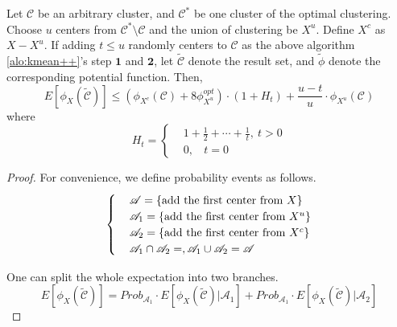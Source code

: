          \begin{lemma}
         \label{corele}
         Let $\mathcal{C}$ be an arbitrary cluster, and $\mathcal{C}^{*}$ be one cluster of the optimal clustering. Choose $u$ centers from $\mathcal{C}^{*} \setminus \mathcal{C}$ and the union of clustering be $X^{u}$. Define $X^{c}$ as $X - X^{u}$. If adding $t \leq u$ randomly centers to $\mathcal{C}$ as the above algorithm \ref{alo:kmean++}'s step $\textbf{1}$ and $\textbf{2}$, let $\tilde{\mathcal{C}}$ denote the result set, and $\tilde{\phi}$ denote the corresponding potential function. Then, 
         \begin{equation}
         E[\phi_{X}(\tilde{\mathcal{C}})] \leq \left(\phi_{X^{c}}(\mathcal{C}) + 8\phi^{opt}_{X^{u}}\right)\cdot (1+H_{t}) + \frac{u-t}{u}\cdot \phi_{X^{u}}(\mathcal{C})         
         \end{equation}
         where 
         \begin{equation}
         H_{t} = \begin{cases}& 1 + \frac{1}{2} + \cdots + \frac{1}{t}, \ \text{$t > 0$}\\
         & 0,\  \text{ $t = 0$}
         \end{cases}
         \end{equation}
         \begin{proof}
         
         For convenience, we define probability events as follows.
         \begin{equation}
         \begin{cases}
        & \mathscr{A} = \{\text{add the first center from $X$}\}\\
         & \mathscr{A}_{1} = \{\text{add the first center from $X^{u}$}\}\\
         &\mathscr{A}_{2}= \{\text{add the first center from $X^{c}$}\}\\
         &\mathscr{A}_{1} \cap \mathscr{A}_{2} = \empty, \mathscr{A}_{1} \cup  \mathscr{A }_{2} = \mathscr{A}
         \end{cases}
         \end{equation}
         
         One can split the whole expectation into two branches.
         \begin{equation}
         E[\phi_{X}(\tilde{\mathcal{C}})] = Prob_{\mathscr{A}_{1}} \cdot E[\phi_{X}(\tilde{\mathcal{C}})|\mathscr{A}_{1}] + Prob_{\mathscr{A}_{1}} \cdot E[\phi_{X}(\tilde{\mathcal{C}})|\mathscr{A}_{2}]
         \end{equation}         


\end{proof}
\end{lemma}

